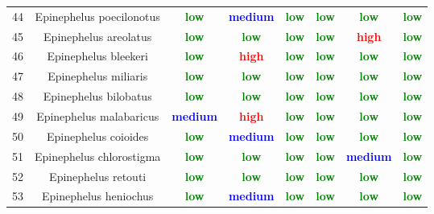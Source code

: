 \documentclass{report}\usepackage[]{graphicx}\usepackage[]{color}
\begin{document}
\begin{table}[ht]
{\begin{tabular}{cccccccc}
   44 & Epinephelus poecilonotus & \textcolor{green}{\textbf{low}} & \textcolor{blue}{\textbf{medium}} & \textcolor{green}{\textbf{low}} & \textcolor{green}{\textbf{low}} & \textcolor{green}{\textbf{low}} & \textcolor{green}{\textbf{low}} \\ 
   45 & Epinephelus areolatus & \textcolor{green}{\textbf{low}} & \textcolor{green}{\textbf{low}} & \textcolor{green}{\textbf{low}} & \textcolor{green}{\textbf{low}} & \textcolor{red}{\textbf{high}} & \textcolor{green}{\textbf{low}} \\ 
   46 & Epinephelus bleekeri & \textcolor{green}{\textbf{low}} & \textcolor{red}{\textbf{high}} & \textcolor{green}{\textbf{low}} & \textcolor{green}{\textbf{low}} & \textcolor{green}{\textbf{low}} & \textcolor{green}{\textbf{low}} \\ 
   47 & Epinephelus miliaris & \textcolor{green}{\textbf{low}} & \textcolor{green}{\textbf{low}} & \textcolor{green}{\textbf{low}} & \textcolor{green}{\textbf{low}} & \textcolor{green}{\textbf{low}} & \textcolor{green}{\textbf{low}} \\ 
   48 & Epinephelus bilobatus & \textcolor{green}{\textbf{low}} & \textcolor{green}{\textbf{low}} & \textcolor{green}{\textbf{low}} & \textcolor{green}{\textbf{low}} & \textcolor{green}{\textbf{low}} & \textcolor{green}{\textbf{low}} \\ 
   49 & Epinephelus malabaricus & \textcolor{blue}{\textbf{medium}} & \textcolor{red}{\textbf{high}} & \textcolor{green}{\textbf{low}} & \textcolor{green}{\textbf{low}} & \textcolor{green}{\textbf{low}} & \textcolor{green}{\textbf{low}} \\ 
   50 & Epinephelus coioides & \textcolor{green}{\textbf{low}} & \textcolor{blue}{\textbf{medium}} & \textcolor{green}{\textbf{low}} & \textcolor{green}{\textbf{low}} & \textcolor{green}{\textbf{low}} & \textcolor{green}{\textbf{low}} \\ 
   51 & Epinephelus chlorostigma & \textcolor{green}{\textbf{low}} & \textcolor{green}{\textbf{low}} & \textcolor{green}{\textbf{low}} & \textcolor{green}{\textbf{low}} & \textcolor{blue}{\textbf{medium}} & \textcolor{green}{\textbf{low}} \\ 
   52 & Epinephelus retouti & \textcolor{green}{\textbf{low}} & \textcolor{green}{\textbf{low}} & \textcolor{green}{\textbf{low}} & \textcolor{green}{\textbf{low}} & \textcolor{green}{\textbf{low}} & \textcolor{green}{\textbf{low}} \\ 
   53 & Epinephelus heniochus & \textcolor{green}{\textbf{low}} & \textcolor{blue}{\textbf{medium}} & \textcolor{green}{\textbf{low}} & \textcolor{green}{\textbf{low}} & \textcolor{green}{\textbf{low}} & \textcolor{green}{\textbf{low}} \\ 

\end{tabular}}
\end{table}
\end{document}
